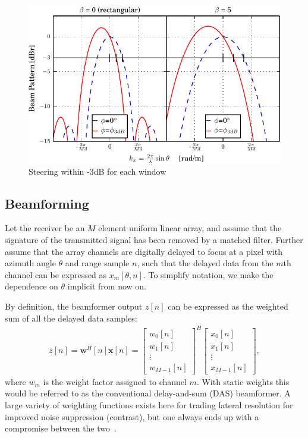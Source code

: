 \documentclass[10pt,journal,draftclsnofoot,onecolumn]{IEEEtran}
\let\MYoriglatexcaption\caption               %
\renewcommand{\caption}[2][\relax]{\MYoriglatexcaption[#2]{#2}}
\newcommand\bmat[1]{\begin{bmatrix}#1\end{bmatrix}}
\renewcommand\H{^{\scriptscriptstyle H}}
\renewcommand\vec[1]{\boldsymbol{#1}}
\newcommand\1{\vec 1}
\newcommand*\w{\vec w}
\newcommand*\x{\vec x}
\begin{document}
\begin{figure}[tbhp]%
\includegraphics[width=\linewidth]{gfx/calc_kaiser_3dB.pdf}%
\caption{Steering within -3dB for each window}\label{windows_steering}
\end{figure}

\subsection{Beamforming}

Let the receiver be an $M$ element uniform linear array, and assume that the signature of the transmitted signal has been removed by a matched filter. Further assume that the array channels are digitally delayed to focus at a pixel with azimuth angle $\theta$ and range sample $n$, such that the delayed data from the $m$th channel can be expressed as $x_m[\theta,n]$. To simplify notation, we make the dependence on $\theta$ implicit from now on. 

By definition, the beamformer output $z[n]$ can be expressed as the weighted sum of all the delayed data samples:
\begin{align}
z[n] = \w\H[n]\x[n] = \bmat{w_0[n]\\w_1[n]\\\vdots\\w_{M-1}[n]}^H \bmat{x_0[n]\\x_1[n]\\\vdots\\x_{M-1}[n]},\label{z}
\end{align}
where $w_m$ is the weight factor assigned to channel $m$. With static weights this would be referred to as the conventional delay-and-sum (DAS) beamformer. A large variety of weighting functions exists here for trading lateral resolution for improved noise suppression (contrast), but one always ends up with a compromise between the two~\cite{Harris1978}.
\end{document}

